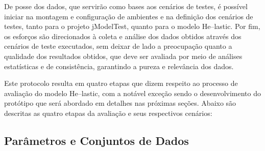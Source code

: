 \documentclass[english,brazilian]{UNISINOSmonografia} %
\begin{document}
De posse dos dados, que servirão como bases aos cenários de testes, é possível iniciar na montagem e configuração de ambientes e na definição dos cenários de testes, tanto para o projeto jModelTest, quanto para o modelo \textsf{He}--lastic.
Por fim, os esforços são direcionados à coleta e análise dos dados obtidos através dos cenários de teste executados, sem deixar de lado a preocupação quanto a qualidade dos resultados obtidos, que deve ser avaliada por meio de análises estatísticas e de consistência, garantindo a pureza e relevância dos dados.


Este protocolo resulta em quatro etapas que dizem respeito ao processo de avaliação do modelo \textsf{He}--lastic, com a notável exceção sendo o desenvolvimento do protótipo que será abordado em detalhes nas próximas seções.
Abaixo são descritas as quatro etapas da avaliação e seus respectivos cenários:

\subsection{Parâmetros e Conjuntos de Dados}
\end{document}
